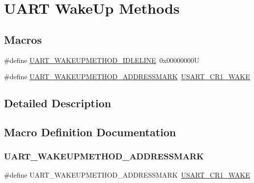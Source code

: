 \hypertarget{group___u_a_r_t___wake_up___methods}{}\section{U\+A\+RT Wake\+Up Methods}
\label{group___u_a_r_t___wake_up___methods}
\subsection*{Macros}
\begin{DoxyCompactItemize}
\item 
\#define \mbox{\hyperlink{group___u_a_r_t___wake_up___methods_ga2411ed44c5d82db84c5819e1e2b5b8b3}{U\+A\+R\+T\+\_\+\+W\+A\+K\+E\+U\+P\+M\+E\+T\+H\+O\+D\+\_\+\+I\+D\+L\+E\+L\+I\+NE}}~0x00000000U
\item 
\#define \mbox{\hyperlink{group___u_a_r_t___wake_up___methods_ga4c6935f26f8f2a9fe70fd6306a9882cb}{U\+A\+R\+T\+\_\+\+W\+A\+K\+E\+U\+P\+M\+E\+T\+H\+O\+D\+\_\+\+A\+D\+D\+R\+E\+S\+S\+M\+A\+RK}}~\mbox{\hyperlink{group___peripheral___registers___bits___definition_gad831dfc169fcf14b7284984dbecf322d}{U\+S\+A\+R\+T\+\_\+\+C\+R1\+\_\+\+W\+A\+KE}}
\end{DoxyCompactItemize}


\subsection{Detailed Description}


\subsection{Macro Definition Documentation}
\mbox{\label{group___u_a_r_t___wake_up___methods_ga4c6935f26f8f2a9fe70fd6306a9882cb}} 
\subsubsection{\texorpdfstring{UART\_WAKEUPMETHOD\_ADDRESSMARK}{UART\_WAKEUPMETHOD\_ADDRESSMARK}}
{\footnotesize\ttfamily \#define U\+A\+R\+T\+\_\+\+W\+A\+K\+E\+U\+P\+M\+E\+T\+H\+O\+D\+\_\+\+A\+D\+D\+R\+E\+S\+S\+M\+A\+RK~\mbox{\hyperlink{group___peripheral___registers___bits___definition_gad831dfc169fcf14b7284984dbecf322d}{U\+S\+A\+R\+T\+\_\+\+C\+R1\+\_\+\+W\+A\+KE}}}

